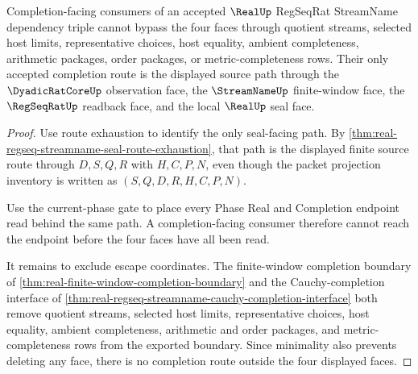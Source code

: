 \begin{theorem}
\label{thm:real-regseq-streamname-no-completion-escape}
Completion-facing consumers of an accepted $\RealUp$ RegSeqRat StreamName
dependency triple cannot bypass the four faces through quotient streams,
selected host limits, representative choices, host equality, ambient
completeness, arithmetic packages, order packages, or metric-completeness
rows. Their only accepted completion route is the displayed source path through
the $\DyadicRatCoreUp$ observation face, the $\StreamNameUp$ finite-window face,
the $\RegSeqRatUp$ readback face, and the local $\RealUp$ seal face.
\end{theorem}
\begin{proof}
Use route exhaustion to identify the only seal-facing path. By
\autoref{thm:real-regseq-streamname-seal-route-exhaustion}, that path is the
displayed finite source route through $D,S,Q,R$ with $H,C,P,N$, even though the
packet projection inventory is written as $(S,Q,D,R,H,C,P,N)$.

Use the current-phase gate to place every Phase Real and Completion endpoint
read behind the same path. A completion-facing consumer therefore cannot
reach the endpoint before the four faces have all been read.

It remains to exclude escape coordinates. The finite-window completion
boundary of \autoref{thm:real-finite-window-completion-boundary} and the
Cauchy-completion interface of
\autoref{thm:real-regseq-streamname-cauchy-completion-interface} both remove
quotient streams, selected host limits, representative choices, host
equality, ambient completeness, arithmetic and order packages, and
metric-completeness rows from the exported boundary. Since minimality also
prevents deleting any face, there is no completion route outside the four
displayed faces.
\end{proof}

